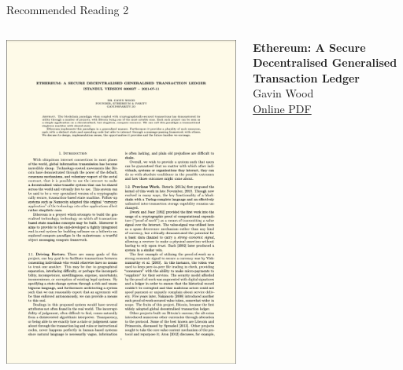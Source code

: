 \documentclass[]{beamer}
\begin{document}
\begin{frame}{Recommended Reading 2}
\begin{columns}
	\begin{column}{0.3\textwidth}
	\center
	\includegraphics[width=\textwidth , frame]{../assets/images/yellowpaper_cover.png}
	\end{column}
	\begin{column}{0.7\textwidth}
	\textbf{Ethereum: A Secure Decentralised Generalised Transaction Ledger} \\
	Gavin Wood \\
	\link \href{https://ethereum.github.io/yellowpaper/paper.pdf}{Online PDF}
	\end{column}
\end{columns}
\end{frame}

%	
%	
\end{document}

